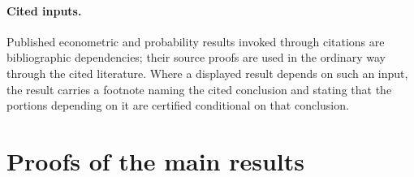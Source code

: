 \documentclass[11pt]{article}
\begin{document}
\paragraph{Cited inputs.}
Published econometric and probability results invoked through citations are bibliographic
dependencies; their source proofs are used in the ordinary way through the cited literature.  Where
a displayed result depends on such an input, the result carries a footnote naming the cited
conclusion and stating that the portions depending on it are certified conditional on that
conclusion.


\section{Proofs of the main results}\label{sec:deferred-proofs}
\end{document}
